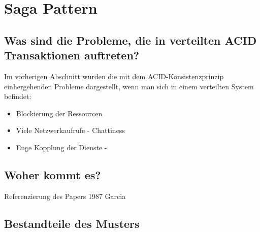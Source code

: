 \section{Saga Pattern}

\subsection{Was sind die Probleme, die in verteilten ACID Transaktionen auftreten?}
Im vorherigen Abschnitt wurden die mit dem ACID-Konsistenzprinzip einhergehenden Probleme dargestellt, wenn man sich in einem verteilten System befindet:
\begin{itemize}
	\item Blockierung der Ressourcen
	\item Viele Netzwerkaufrufe - Chattiness
	\item Enge Kopplung der Dienste - 
\end{itemize}
\subsection{Woher kommt es?}
Referenzierung des Papers 1987 Garcia

\subsection{Bestandteile des Musters}
